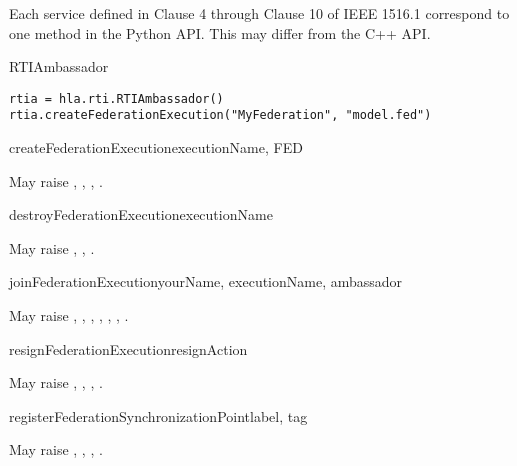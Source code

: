 Each service defined in Clause 4 through Clause 10 of IEEE 1516.1 correspond to
one method in the Python API. This may differ from the C++ API.

\begin{classdesc}{RTIAmbassador}{}

\begin{verbatim} 
rtia = hla.rti.RTIAmbassador()
rtia.createFederationExecution("MyFederation", "model.fed")
\end{verbatim}

\medskip
{}

\begin{methoddesc}{createFederationExecution}{executionName, FED}

May raise
,
,
,
.
\end{methoddesc}

\begin{methoddesc}{destroyFederationExecution}{executionName}

May raise
,
,
.
\end{methoddesc}

\begin{methoddesc}[federate]{joinFederationExecution}{yourName, executionName, ambassador}

May raise
,
,
,
,
,
,
.
\end{methoddesc}

\begin{methoddesc}{resignFederationExecution}{resignAction}

May raise
,
,
,
.
\end{methoddesc}

\begin{methoddesc}{registerFederationSynchronizationPoint}{label, tag}

May raise
,
,
,
.
\end{methoddesc}


\end{classdesc}
